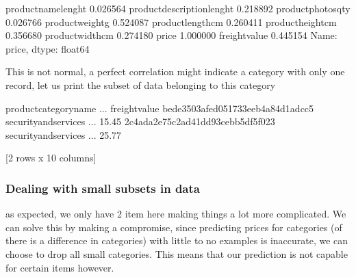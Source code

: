 \documentclass[letterpaper,10pt,english]{jupyterBook}
\begin{document}
\begin{sphinxVerbatim}[commandchars=\\\{\}]
product\PYGZus{}name\PYGZus{}lenght           0.026564
product\PYGZus{}description\PYGZus{}lenght    0.218892
product\PYGZus{}photos\PYGZus{}qty            0.026766
product\PYGZus{}weight\PYGZus{}g              0.524087
product\PYGZus{}length\PYGZus{}cm             0.260411
product\PYGZus{}height\PYGZus{}cm             0.356680
product\PYGZus{}width\PYGZus{}cm              0.274180
price                         1.000000
freight\PYGZus{}value                 0.445154
Name: price, dtype: float64
\end{sphinxVerbatim}

\sphinxAtStartPar
This is not normal, a perfect correlation might indicate a category with only one record, let us print the subset of data belonging to this category

\begin{sphinxVerbatim}[commandchars=\\\{\}]
\PYG{p}{[}\PYG{p}{[}\PYG{p}{]}\PYG{p}{]}
\end{sphinxVerbatim}

\begin{sphinxVerbatim}[commandchars=\\\{\}]
                                  product\PYGZus{}category\PYGZus{}name  ...  freight\PYGZus{}value
bede3503afed051733eeb4a84d1adcc5  security\PYGZus{}and\PYGZus{}services  ...          15.45
2c4ada2e75c2ad41dd93cebb5df5f023  security\PYGZus{}and\PYGZus{}services  ...          25.77

[2 rows x 10 columns]
\end{sphinxVerbatim}


\subsubsection{Dealing with small subsets in data}
\label{\detokenize{c7_case_studies/Olist:dealing-with-small-subsets-in-data}}
\sphinxAtStartPar
as expected, we only have 2 item here making things a lot more complicated. We can solve this by making a compromise, since predicting prices for categories (of there is a difference in categories) with little to no examples is inaccurate, we can choose to drop all small categories. This means that our prediction is not capable for certain items however.
\end{document}
